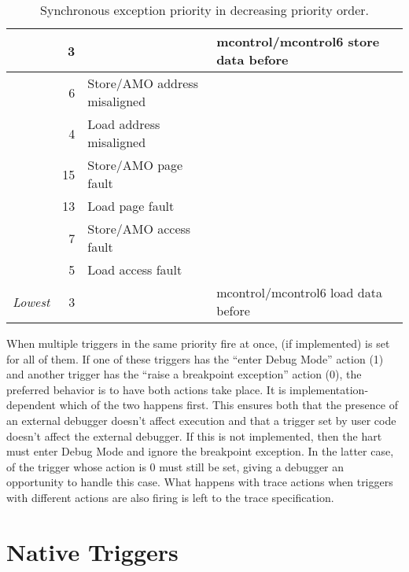 \begin{table}[H]
\begin{tabular}{|l|r|l|l|}
                &          3 & & mcontrol/mcontrol6 store data before \\ \hline
                &          6 & Store/AMO address misaligned & \\
                &          4 & Load address misaligned & \\ \hline
                &         15 & Store/AMO page fault & \\
                &         13 & Load page fault & \\ \hline
                &          7 & Store/AMO access fault & \\
                &          5 & Load access fault & \\
  {\em Lowest}  &          3 & & mcontrol/mcontrol6 load data before \\
  \hline
\end{tabular}
\caption{Synchronous exception priority in decreasing priority order.}
\label{tab:priority}
\end{table}

When multiple triggers in the same priority fire at once, \FcsrMcontrolHit (if
implemented) is set for all of them. If one of these triggers has
the ``enter Debug Mode'' action (1) and another
trigger has the ``raise a breakpoint exception'' action (0),
the preferred behavior is to have both actions take place.  It is
implementation-dependent which of the two happens first.  This ensures both
that the presence of an external debugger doesn't affect execution and that a
trigger set by user code doesn't affect the external debugger. If this is not
implemented, then the hart must enter Debug Mode and ignore the breakpoint
exception. In the latter case, \FcsrMcontrolHit of the trigger whose action is 0 must still
be set, giving a debugger an opportunity to handle this case. What happens with
trace actions when triggers with different actions are also firing is left to
the trace specification.

\section{Native Triggers}
\label{sec:nativetrigger}

